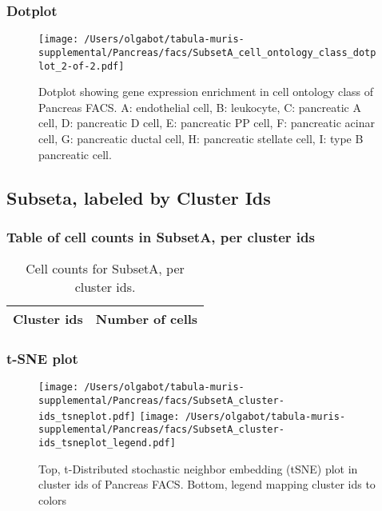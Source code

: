 \clearpage
\clearpage
\subsubsection{Dotplot}
\begin{figure}[h]
\centering
\texttt{[image: /Users/olgabot/tabula-muris-supplemental/Pancreas/facs/SubsetA\_cell\_ontology\_class\_dotplot\_2-of-2.pdf]}

\caption{ Dotplot  showing gene expression enrichment in cell ontology class of Pancreas FACS. A: endothelial cell, B: leukocyte, C: pancreatic A cell, D: pancreatic D cell, E: pancreatic PP cell, F: pancreatic acinar cell, G: pancreatic ductal cell, H: pancreatic stellate cell, I: type B pancreatic cell.}
\end{figure}


\clearpage
\subsection{Subseta, labeled by Cluster Ids}
\subsubsection{Table of cell counts in SubsetA, per cluster ids}\begin{table}[h]
\centering
\label{my-label}
\begin{tabular}{@{}ll@{}}
\toprule

Cluster ids& Number of cells \\ \midrule\bottomrule
\end{tabular}
\caption{Cell counts for SubsetA, per cluster ids.}
\end{table}

\clearpage
\subsubsection{t-SNE plot}
\begin{figure}[h]
\centering
\texttt{[image: /Users/olgabot/tabula-muris-supplemental/Pancreas/facs/SubsetA\_cluster-ids\_tsneplot.pdf]}
\texttt{[image: /Users/olgabot/tabula-muris-supplemental/Pancreas/facs/SubsetA\_cluster-ids\_tsneplot\_legend.pdf]}
\caption{Top, t-Distributed stochastic neighbor embedding (tSNE) plot  in cluster ids of Pancreas FACS. Bottom, legend mapping cluster ids to colors}
\end{figure}


\clearpage
\clearpage
